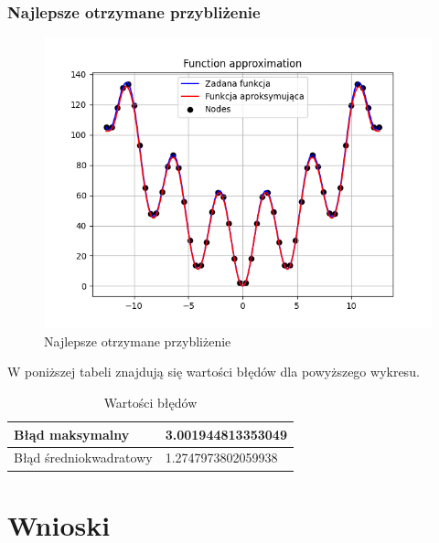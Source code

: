 \documentclass{article}
\begin{document}
\subsubsection{Najlepsze otrzymane przybliżenie}

\begin{figure}[H]
\centering
  \begin{minipage}[b]{0.49\textwidth}
    \includegraphics[width=\textwidth]{img30.png}
    \caption{Najlepsze otrzymane przybliżenie}
  \end{minipage}
\end{figure}

W poniższej tabeli znajdują się wartości błędów dla powyższego wykresu.

\begin{table}[!ht]
    \centering
    \begin{tabular}{|l|l|}
    \hline
        Błąd maksymalny & 3.001944813353049 \\ \hline
        Błąd średniokwadratowy & 1.2747973802059938 \\ \hline
    \end{tabular}
    \caption{Wartości błędów}
\end{table}

\newpage

\section{Wnioski}
\end{document}
